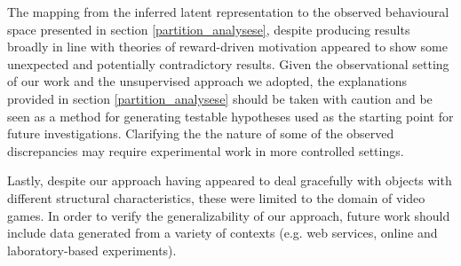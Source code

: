 The mapping from the inferred latent representation to the observed behavioural space  presented in section \ref{partition_analysese}, despite producing results broadly in line with theories of reward-driven motivation \cite{thorndike1927law,skinner1965science,berridge2004motivation} appeared to show some unexpected and potentially contradictory results. Given the observational setting of our work and the unsupervised approach we adopted, the explanations provided in section \ref{partition_analysese} should be taken with caution and be seen as a method for generating testable hypotheses used as the starting point for future investigations. Clarifying the the nature of some of the observed discrepancies may require experimental work in more controlled settings. 

Lastly, despite our approach having appeared to deal gracefully with objects with different structural characteristics, these were limited to the domain of video games. In order to verify the generalizability of our approach, future work should include data generated from a variety of contexts (e.g. web services, online and laboratory-based experiments).  

